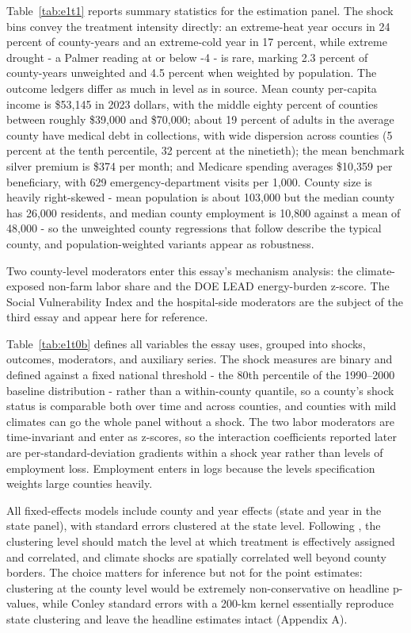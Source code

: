 \documentclass[a4paper,11pt]{report}
\begin{document}
Table~\ref{tab:e1t1} reports summary statistics for the estimation panel. The shock bins convey the treatment intensity directly: an extreme-heat year occurs in 24 percent of county-years and an extreme-cold year in 17 percent, while extreme drought - a Palmer reading at or below -4 - is rare, marking 2.3 percent of county-years unweighted and 4.5 percent when weighted by population. The outcome ledgers differ as much in level as in source. Mean county per-capita income is \$53,145 in 2023 dollars, with the middle eighty percent of counties between roughly \$39,000 and \$70,000; about 19 percent of adults in the average county have medical debt in collections, with wide dispersion across counties (5 percent at the tenth percentile, 32 percent at the ninetieth); the mean benchmark silver premium is \$374 per month; and Medicare spending averages \$10,359 per beneficiary, with 629 emergency-department visits per 1,000. County size is heavily right-skewed - mean population is about 103,000 but the median county has 26,000 residents, and median county employment is 10,800 against a mean of 48,000 - so the unweighted county regressions that follow describe the typical county, and population-weighted variants appear as robustness.



Two county-level moderators enter this essay's mechanism analysis: the climate-exposed non-farm labor share and the DOE LEAD energy-burden z-score. The Social Vulnerability Index and the hospital-side moderators are the subject of the third essay and appear here for reference.

Table~\ref{tab:e1t0b} defines all variables the essay uses, grouped into shocks, outcomes, moderators, and auxiliary series. The shock measures are binary and defined against a fixed national threshold - the 80th percentile of the 1990--2000 baseline distribution - rather than a within-county quantile, so a county's shock status is comparable both over time and across counties, and counties with mild climates can go the whole panel without a shock. The two labor moderators are time-invariant and enter as z-scores, so the interaction coefficients reported later are per-standard-deviation gradients within a shock year rather than levels of employment loss. Employment enters in logs because the levels specification weights large counties heavily.

All fixed-effects models include county and year effects (state and year in the state panel), with standard errors clustered at the state level. Following \citet{abadie2023clustering}, the clustering level should match the level at which treatment is effectively assigned and correlated, and climate shocks are spatially correlated well beyond county borders. The choice matters for inference but not for the point estimates: clustering at the county level would be extremely non-conservative on headline p-values, while Conley standard errors with a 200-km kernel essentially reproduce state clustering and leave the headline estimates intact (Appendix A). \citep{conley1999gmm}
\end{document}
